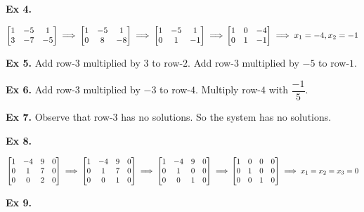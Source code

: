 \documentclass{article}
\begin{document}
\textbf{Ex 4.}

$
\begin{bmatrix}
1 &-5 &1\\
3 &-7 &-5
\end{bmatrix}
\implies
\begin{bmatrix}
1 &-5 &1\\
0 &8 &-8
\end{bmatrix}
\implies
\begin{bmatrix}
1 &-5 &1\\
0 &1 &-1
\end{bmatrix}
\implies\\
\begin{bmatrix}
1 &0 &-4\\
0 &1 &-1
\end{bmatrix}
\implies x_1=-4, x_2=-1
$

\textbf{Ex 5.} Add row-$3$ multiplied by $3$ to row-$2$. Add row-$3$ multiplied by $-5$ to row-$1$.

\textbf{Ex 6.} Add row-$3$ multiplied by $-3$ to row-$4$. Multiply row-$4$ with $\dfrac{-1}{5}$.

\textbf{Ex 7.} Observe that row-$3$ has no solutions. So the system has no solutions.

\textbf{Ex 8.}

$
\begin{bmatrix}
1 &-4 &9 &0\\
0 &1 &7 &0\\
0 &0 &2 &0
\end{bmatrix}
\implies
\begin{bmatrix}
1 &-4 &9 &0\\
0 &1 &7 &0\\
0 &0 &1 &0
\end{bmatrix}
\implies
\begin{bmatrix}
1 &-4 &9 &0\\
0 &1 &0 &0\\
0 &0 &1 &0
\end{bmatrix}
\implies\\
\begin{bmatrix}
1 &0 &0 &0\\
0 &1 &0 &0\\
0 &0 &1 &0
\end{bmatrix}
\implies x_1 = x_2 = x_3 = 0
$

\textbf{Ex 9.}
\end{document}

